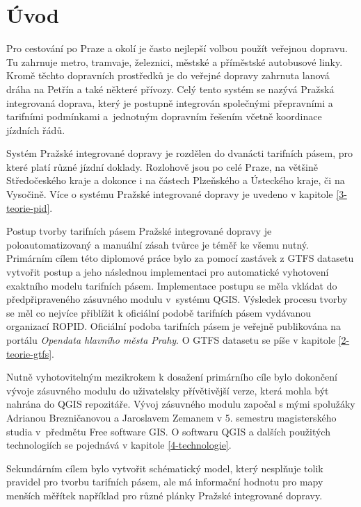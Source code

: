 \chapter*{Úvod}
\label{0-uvod}

Pro cestování po Praze a okolí je často nejlepší volbou použít veřejnou dopravu. 
Tu zahrnuje metro, tramvaje, železnici, městské a příměstské autobusové linky.
Kromě těchto dopravních prostředků je do veřejné dopravy zahrnuta lanová dráha na Petřín a také některé přívozy. 
Celý tento systém se nazývá Pražská integrovaná doprava, který je postupně integrován společnými přepravními
a tarifními podmínkami a~jednotným dopravním řešením včetně koordinace jízdních řádů.

Systém Pražské integrované dopravy je rozdělen do dvanácti tarifních pásem, pro
které platí různé jízdní doklady. Rozlohově jsou po celé Praze, na většině
Středočeského kraje a dokonce i na částech Plzeňského a Ústeckého kraje, či na Vysočině.
Více o systému Pražské integrované dopravy je uvedeno v kapitole \ref{3-teorie-pid}.

Postup tvorby tarifních pásem Pražské integrované dopravy je poloautomatizovaný
a manuální zásah tvůrce je téměř ke všemu nutný.
Primárním cílem této diplomové práce bylo za pomocí zastávek z GTFS datasetu vytvořit 
postup a jeho následnou implementaci pro automatické vyhotovení exaktního modelu tarifních pásem.
Implementace postupu se měla vkládat do předpřipraveného zásuvného mo\-dulu v~systému QGIS.
Výsledek procesu tvorby se měl co nejvíce přiblížit k oficiální podobě tarifních pásem
vydávanou organizací ROPID. 
Oficiální podoba tarifních pásem je veřejně publikována na portálu \textit{Opendata hlavního města Prahy}.
O GTFS datasetu se píše v kapitole \ref{2-teorie-gtfs}.

Nutně vyhotovitelným mezikrokem k dosažení primárního cíle bylo dokončení
vývoje zásuvného modulu do uživatelsky přívětivější verze, která mohla být nahrána do QGIS repozitáře.
Vývoj zásuvného modulu započal s mými spolužáky Adrianou Brezničanovou a Jaroslavem
Zemanem v 5. semestru magisterského studia v~předmětu Free software GIS.
O softwaru QGIS a dalších použitých technologiích se pojednává v kapitole \ref{4-technologie}. 

Sekundárním cílem bylo vytvořit schématický model, který nesplňuje tolik
pravi\-del pro tvorbu tarifních pásem, ale má informační hodnotu pro mapy menších měřítek
například pro různé plánky Pražské integrované dopravy.

